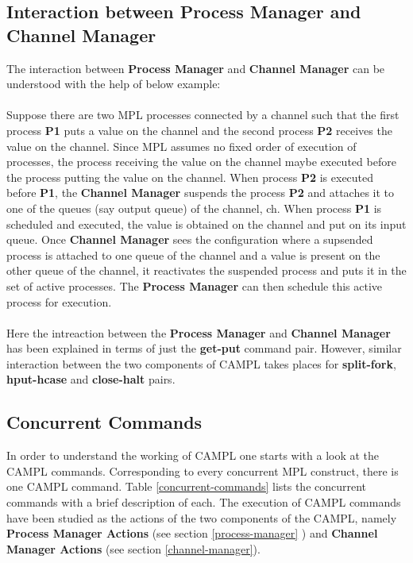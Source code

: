 \documentclass[11pt]{article}
\newcommand{\<}{\langle}
\renewcommand{\>}{\rangle}
\begin{document}
\subsection {Interaction between Process Manager and Channel Manager}
The interaction between {\bf Process Manager} and {\bf Channel Manager} can be understood with the help of below example:
~~\\~~\\
Suppose there are two MPL processes connected by a channel such that the first process {\bf P1} puts a value on the channel and the second process {\bf P2} receives the value on the channel. Since MPL assumes no fixed order of execution of processes, the process receiving the value on the channel maybe executed before the process putting the value on the channel. When process {\bf P2} is executed before {\bf P1}, the {\bf Channel Manager} suspends the process {\bf P2} and attaches it to one of the queues (say output queue) of the channel, ch. When process {\bf P1} is scheduled and executed, the value is obtained on the channel and put on its input queue. Once {\bf Channel Manager} sees the configuration where a supsended process is attached to one queue of the channel and a value is present on the other queue of the channel, it reactivates the suspended process and puts it in the set of active processes. The {\bf Process Manager} can then schedule this active process for execution.
~~\\~~\\ 
Here the intreaction between the {\bf Process Manager} and {\bf Channel Manager} has been explained in terms of just the {\bf get-put} command pair. However, similar interaction between the two components of CAMPL takes places for {\bf split-fork}, {\bf hput-hcase} and {\bf close-halt} pairs.
\subsection {Concurrent Commands}
In order to understand the working of CAMPL one starts with a look at the CAMPL commands. Corresponding to every concurrent MPL construct, there is one CAMPL command. Table \ref {concurrent-commands} lists the concurrent commands with a brief description of each. The execution of CAMPL commands have been studied as the actions of the two components of the CAMPL, namely {\bf Process Manager Actions} (see section \ref {process-manager} ) and  {\bf Channel Manager Actions} (see section  \ref {channel-manager}).   
\end{document}
